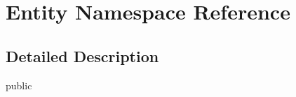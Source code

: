 \hypertarget{namespace_entity}{}\section{Entity Namespace Reference}
\label{namespace_entity}


\subsection{Detailed Description}
public 